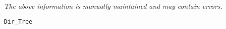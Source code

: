 \label{pkg:symlink\_tree}

{\tiny \it The above information is manually maintained and may contain errors.}
\begin{verbatim}
Dir_Tree
\end{verbatim}
